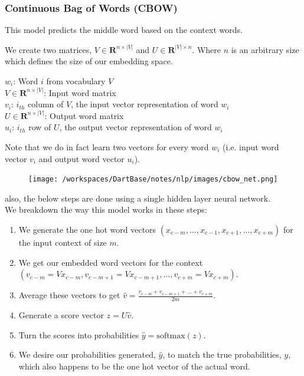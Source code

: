 \documentclass[12pt]{article}
\begin{document}
        \subsubsection{Continuous Bag of Words (CBOW)}
            This model predicts the middle word based on the context words.
            
            We create two matrices, $V \in \textbf{R}^{n \times |V|}$ and $U \in \textbf{R}^{|V| \times n}$. Where $n$ is an arbitrary size which defines the size of our embedding space.
            \begin{mdframed}
            $w_i$: Word $i$ from vocabulary $V$ \\
            $V \in \textbf{R}^{n \times |V|}$: Input word matrix \\
            $v_i$: $i_{th}$ column of $V$, the input vector representation of word $w_i$\\
            $U \in \textbf{R}^{n \times |V|}$: Output word matrix\\
            $u_i$: $i_{th}$ row of $U$, the output vector representation of word $w_i$
            \end{mdframed}
            Note that we do in fact learn two vectors for every word $w_i$ (i.e. input word vector $v_i$ and output word vector $u_i$).
            \begin{figure}[h]
                \centering
                \texttt{[image: /workspaces/DartBase/notes/nlp/images/cbow\_net.png]}
            \end{figure}
            also, the below steps are done using a single hidden layer neural network.\\
            We breakdown the way this model works in these steps:
            \begin{enumerate}
                \item We generate the one hot word vectors $(x_{c-m}, \ldots, x_{c-1}, x_{c+1}, \ldots, x_{c+m})$ for the input context of size $m$.
                \item We get our embedded word vectors for the context  \\
                $(v_{c-m} = Vx_{c-m}, v_{c-m+1} = Vx_{c-m+1}, \ldots, v_{c+m} = Vx_{c+m})$.
                \item Average these vectors to get $\hat{v} = \frac{v_{c-m} + v_{c-m+1} + \ldots + v_{c+m}}{2m}$.
                \item Generate a score vector $z = U\hat{v}$.
                \item Turn the scores into probabilities $\hat{y} = \text{softmax}(z)$.
                \item We desire our probabilities generated, $\hat{y}$, to match the true probabilities, $y$, which also happens to be the one hot vector of the actual word.
            \end{enumerate}
            
\end{document}
